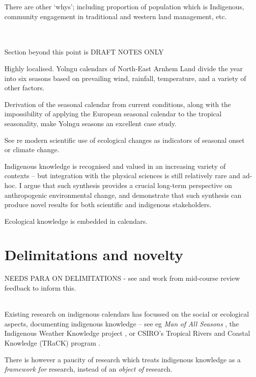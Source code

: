 There are other `whys'; including proportion of population which is Indigenous,
community engagement in traditional and western land management, etc.


~\\
~\\
Section beyond this point is DRAFT NOTES ONLY


Highly localised.
Yolngu calendars of North-East Arnhem Land divide the year into
six seasons based on prevailing wind, rainfall, temperature,
and a variety of other factors.

Derivation of the seasonal calendar from current conditions,
along with the impossibility of applying the European seasonal calendar
to the tropical seasonality, make Yolngu seasons an excellent case study.

See \citet{menzel2006} re modern scientific use of ecological changes
as indicators of seasonal onset or climate change.



Indigenous knowledge is recognised and valued in an increasing variety
of contexts \citep[eg.][]{petheram2010,cochran2015,berkes2012} –
but integration with the physical sciences is still relatively rare and ad-hoc.
%
I argue that such synthesis provides a crucial long-term perspective on
anthropogenic environmental change, and demonstrate that such synthesis
can produce novel results for both scientific and indigenous stakeholders.

Ecological knowledge is embedded in calendars.



\section{Delimitations and novelty}

NEEDS PARA ON DELIMITATIONS - see and work from mid-course review feedback to inform this.

~\\

Existing research on indigenous calendars has focussed on the social or ecological aspects,
documenting indigenous knowledge – see eg \textit{Man of All Seasons} \citep{davis1989},
the Indigenous Weather Knowledge project \citet{BOM-iwk},
or CSIRO’s Tropical Rivers and Coastal Knowledge (TRaCK) program \citep{CSIROcals,oconnor2010}.

There is however a paucity of research which treats indigenous knowledge
as a \emph{framework for} research, instead of an \emph{object of} research.

